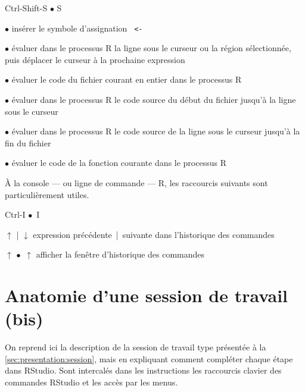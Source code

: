 \begin{ttscript}{Ctrl-Shift-S $\bullet$ \cmdkey\shiftkey S}
  \raggedright
\item[\code{Alt+-} $\bullet$ \code{\optkey\,-}] insérer le
  symbole d'assignation \verb*| <- |
\item[\code{Ctrl+Retour} $\bullet$ \code{\cmdkey\,\returnkey}]
  évaluer dans le processus R la ligne sous le curseur ou la région
  sélectionnée, puis déplacer le curseur à la prochaine expression
\item[\code{Ctrl+Shift+S} $\bullet$ \code{\shiftkey\,\cmdkey\,S}]
  évaluer le code du fichier courant en entier dans le processus R
\item[\code{Ctrl+Alt+B} $\bullet$ \code{\optkey\,\cmdkey\,B}]
  évaluer dans le processus R le code source du début du fichier
  jusqu'à la ligne sous le curseur
\item[\code{Ctrl+Alt+E} $\bullet$ \code{\optkey\,\cmdkey\,E}]
  évaluer dans le processus R le code source de la ligne sous le curseur
  jusqu'à la fin du fichier
\item[\code{Ctrl+Alt+F} $\bullet$ \code{\optkey\,\cmdkey\,F}]
  évaluer le code de la fonction courante dans le processus R
\end{ttscript}

À la console --- ou ligne de commande --- R, les raccourcis suivants
sont particulièrement utiles.
\begin{ttscript}{Ctrl-I $\bullet$ \cmdkey\,I}
  \raggedright
\item[$\uparrow$ | $\downarrow$] expression
  précédente~|~suivante dans l'historique des commandes
\item[\code{Ctrl+}$\uparrow$ $\bullet$ \cmdkey\,$\uparrow$] afficher
  la fenêtre d'historique des commandes
\end{ttscript}


\section{Anatomie d'une session de travail (bis)}
\label{sec:rstudio:session}

On reprend ici la description de %
la session de travail %
type présentée à la \autoref{sec:presentation:session}, mais en
expliquant comment compléter chaque étape dans RStudio. Sont
intercalés dans les instructions les raccourcis clavier des commandes
RStudio et les accès par les menus.

